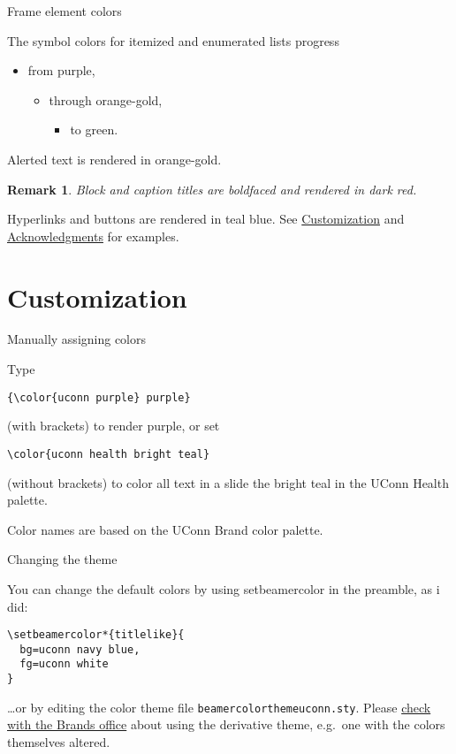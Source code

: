 \documentclass{beamer}
\newtheorem{remark}{Remark}
\begin{document}
\begin{frame}{Frame element colors}

The symbol colors for itemized and enumerated lists progress
\begin{itemize}
\item from purple,
\begin{itemize}
\item through orange-gold,
\begin{itemize}
\item to green.
\end{itemize}
\end{itemize}
\end{itemize}
\alert{Alerted text is rendered in orange-gold.}

\vfill\begin{remark}
Block and caption titles are boldfaced and rendered in dark red.
\end{remark}

\vfill
Hyperlinks and buttons are rendered in teal blue.
See \hyperlink{sec:customization}{Customization} and \hyperlink{slide:acknowledgments}{Acknowledgments} for examples.

\end{frame}


\section{Customization}
\label{sec:customization}


\begin{frame}[fragile]{Manually assigning colors}

Type
\begin{verbatim}
{\color{uconn purple} purple}
\end{verbatim}
(with brackets) to render {\color{uconn purple} purple}, or set
\begin{verbatim}
\color{uconn health bright teal}
\end{verbatim}
\color{uconn health bright teal}
(without brackets) to color all text in a slide the bright teal in the UConn Health palette.

\color{black}\vfill
Color names are based on the UConn Brand color palette.

\center\href{http://brand.uconn.edu/standards/color-palette/}{}

\end{frame}


\begin{frame}[fragile]{Changing the theme}

You can change the default colors by using setbeamercolor in the preamble, as i did:
\begin{verbatim}
\setbeamercolor*{titlelike}{
  bg=uconn navy blue,
  fg=uconn white
}
\end{verbatim}
\ldots or by editing the color theme file {\tt beamercolorthemeuconn.sty}.
Please \hyperlink{mailto:brand@uconn.edu}{check with the Brands office} about using the derivative theme, e.g.\ one with the colors themselves altered.

\end{frame}
\end{document}
